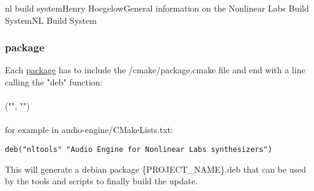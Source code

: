 \documentclass[11pt]{article}
\begin{document}
\begin{Name}{1}{nl build system}{Henry Hoegelow}{General information on the Nonlinear Labs Build System}{NL Build System}
\subsubsection{package} \label{cmake-package}
Each \hyperref[packages]{package} has to include the /cmake/package.cmake file and end with a line calling the "deb" function:\\
\\
("", "")\\
\\
for example in audio-engine/CMakeLists.txt:
\begin{verbatim}
deb("nltools" "Audio Engine for Nonlinear Labs synthesizers")
\end{verbatim}
This will generate a debian package \{PROJECT\_NAME\}.deb that can be used by the tools and scripts to finally build the update.


\end{Name}
\end{document}
